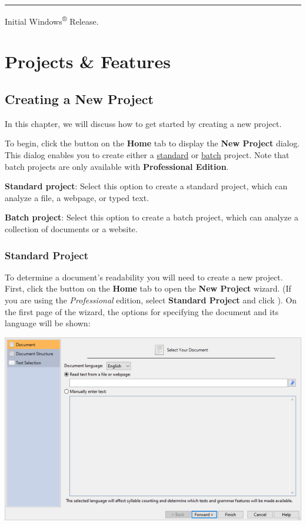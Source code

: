 \documentclass[
]{book}
\theoremstyle{definition}
\theoremstyle{definition}
\theoremstyle{definition}
\theoremstyle{definition}
\theoremstyle{remark}
\begin{document}
\begin{center}\rule{0.5\linewidth}{0.5pt}\end{center}

Initial Windows\textsuperscript{®} Release.

\hypertarget{part-projects-features}{%
\part{Projects \& Features}\label{part-projects-features}}

\hypertarget{creating-a-new-project}{%
\chapter{Creating a New Project}\label{creating-a-new-project}}

In this chapter, we will discuss how to get started by creating a new project.

To begin, click the  button on the \textbf{Home} tab to display the \textbf{New Project} dialog. This dialog enables you to create either a \protect\hyperlink{creating-standard-project}{standard} or \protect\hyperlink{creating-batch-project}{batch} project. Note that batch projects are only available with \textbf{Professional Edition}.

\textbf{Standard project}: Select this option to create a standard project, which can analyze a file, a webpage, or typed text.

\textbf{Batch project}: Select this option to create a batch project, which can analyze a collection of documents or a website.

\hypertarget{creating-standard-project}{%
\section{Standard Project}\label{creating-standard-project}}

To determine a document's readability you will need to create a new project. First, click the  button on the \textbf{Home} tab to open the \textbf{New Project} wizard. (If you are using the \emph{Professional} edition, select \textbf{Standard Project} and click ). On the first page of the wizard, the options for specifying the document and its language will be shown:

\includegraphics{Images/wizard1.png}
\end{document}
